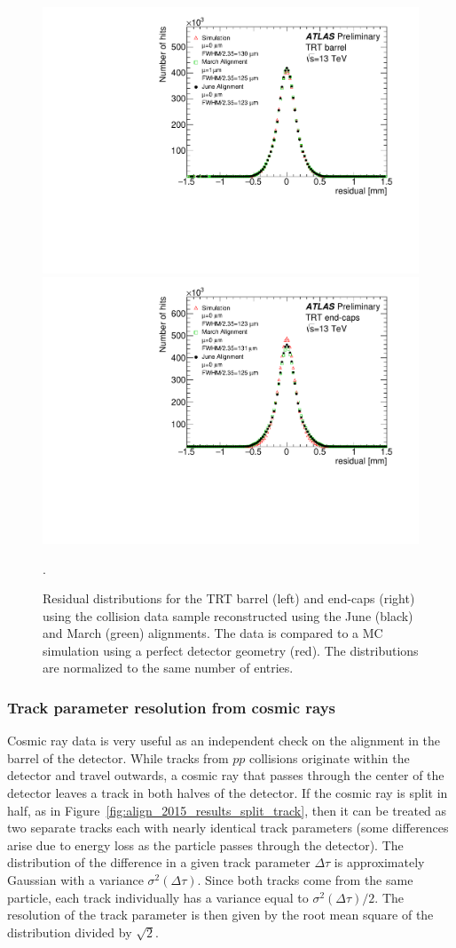 \begin{figure}[htbp]
  \centering
  \includegraphics[width=.48\textwidth]{figs/alignment/align2015/TRTR}
  \includegraphics[width=.48\textwidth]{figs/alignment/align2015/TRTEC}
  \caption{Residual distributions for the TRT barrel (left) and end-caps (right) using the  collision data sample reconstructed using the June (black) and March (green) alignments.  The data is compared to a MC simulation using a perfect detector geometry (red).  The distributions are normalized to the same number of entries.}
  \label{fig:align_2015_results_trt}.
\end{figure}

\subsubsection{Track parameter resolution from cosmic rays}\label{align:2015_results_cosmic}
Cosmic ray data is very useful as an independent check on the alignment in the barrel of the detector.
While tracks from $pp$ collisions originate within the detector and travel outwards, a cosmic ray that passes through the center of the detector leaves a track in both halves of the detector.
If the cosmic ray is split in half, as in Figure~\ref{fig:align_2015_results_split_track}, then it can be treated as two separate tracks each with nearly identical track parameters (some differences arise due to energy loss as the particle passes through the detector).
The distribution of the difference in a given track parameter $\Delta\tau$ is approximately Gaussian with a variance $\sigma^2(\Delta\tau)$.
Since both tracks come from the same particle, each track individually has a variance equal to $\sigma^2(\Delta\tau)/2$.
The resolution of the track parameter is then given by the root mean square of the distribution divided by $\sqrt{2}$.

